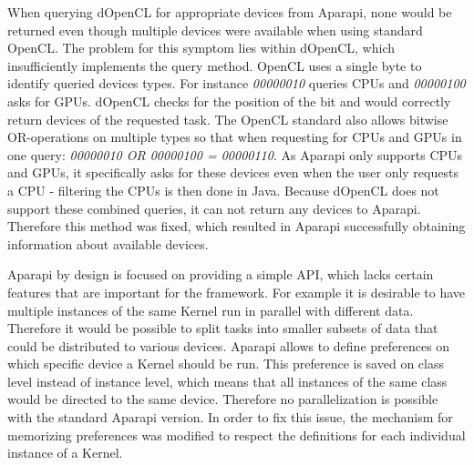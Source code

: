 \begin{description}[style=nextline]
	\item [No Available Devices]
	When querying dOpenCL for appropriate devices from Aparapi, none would be returned even though multiple devices were available when using standard OpenCL. The problem for this symptom lies within dOpenCL, which insufficiently implements the query method. OpenCL uses a single byte to identify queried devices types. For instance \textit{00000010} queries CPUs and \textit{00000100} asks for GPUs. dOpenCL checks for the position of the bit and would correctly return devices of the requested task. The OpenCL standard also allows bitwise OR-operations on multiple types so that when requesting for CPUs and GPUs in one query: \textit{00000010 OR 00000100 = 00000110}. As Aparapi only supports CPUs and GPUs, it specifically asks for these devices even when the user only requests a CPU - filtering the CPUs is then done in Java. Because dOpenCL does not support these combined queries, it can not return any devices to Aparapi. Therefore this method was fixed, which resulted in Aparapi successfully obtaining information about available devices.
	
	\item [Specific Device Choice]
	Aparapi by design is focused on providing a simple API, which lacks certain features that are important for the framework. For example it is desirable to have multiple instances of the same Kernel run in parallel with different data. Therefore it would be possible to split tasks into smaller subsets of data that could be distributed to various devices. Aparapi allows to define preferences on which specific device a Kernel should be run. This preference is saved on class level instead of instance level, which means that all instances of the same class would be directed to the same device. Therefore no parallelization is possible with the standard Aparapi version. In order to fix this issue, the mechanism for memorizing preferences was modified to respect the definitions for each individual instance of a Kernel.
	

\end{description}
